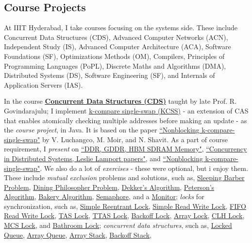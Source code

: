 \subsection{Course Projects}

At IIIT Hyderabad, I take courses focusing on the systems side. These include Concurrent Data Structures (CDS), Advanced Computer Networks (ACN), Independent Study (IS), Advanced Computer Architecture (ACA), Software Foundations (SF), Optimizations Methods (OM), Compilers, Principles of Programming Languages (PoPL), Discrete Maths and Algorithms (DMA), Distributed Systems (DS), Software Engineering (SF), and Internals of Application Servers (IAS).

In the course \textbf{\href{https://github.com/iiithf/concurrent-data-structures}{Concurrent Data Structures (CDS)}} taught by late Prof. R. Govindarajulu; I implement \href{https://github.com/javaf/k-compare-single-swap}{k-compare single-swap (KCSS)} - an extension of CAS that enables atomically checking multiple addresses before making an update - as the \textit{course project}, in Java. It is based on the paper \href{https://dl.acm.org/doi/10.1145/777412.777468}{``Nonblocking k-compare-single-swap"} by V. Luchangco, M. Moir, and N. Shavit. As a part of course requirement, I \textit{present} on \href{https://gist.github.com/wolfram77/28da72ab511eacafbd55f3576fb03019}{``DDR, GDDR, HBM SDRAM Memory"}, \href{https://gist.github.com/wolfram77/3507129650f2e56e00da013a7de93ddb}{``Concurrency in Distributed Systems, Leslie Lamport papers"}, and \href{https://gist.github.com/wolfram77/77758eb9f7d393598fc142d9559e5a5e}{``Nonblocking k-compare-single-swap"}. We also do a lot of \textit{exercises} - these were optional, but i enjoy them. These include \textit{mutual exclusion} problems and solutions, such as, \href{https://github.com/javaf/sleeping-barber-problem}{Sleeping Barber Problem}, \href{https://github.com/javaf/dining-philosophers-problem}{Dining Philosopher Problem}, \href{https://github.com/javaf/dekker-algorithm}{Dekker's Algorithm}, \href{https://github.com/javaf/peterson-algorithm}{Peterson's Algorithm}, \href{https://github.com/javaf/bakery-algorithm}{Bakery Algorithm}, \href{https://github.com/javaf/simple-semaphore}{Semaphore}, and a \href{https://github.com/javaf/monitor-example}{Monitor}; \textit{locks} for synchronization, such as, \href{https://github.com/javaf/simple-reentrant-lock}{Simple Reentrant Lock}, \href{https://github.com/javaf/simple-read-write-lock}{Simple Read Write Lock}, \href{https://github.com/javaf/fifo-read-write-lock}{FIFO Read Write Lock}, \href{https://github.com/javaf/tas-lock}{TAS Lock}, \href{https://github.com/javaf/ttas-lock}{TTAS Lock}, \href{https://github.com/javaf/backoff-lock}{Backoff Lock}, \href{https://github.com/javaf/array-lock}{Array Lock}, \href{https://github.com/javaf/clh-lock}{CLH Lock}, \href{https://github.com/javaf/mcs-lock}{MCS Lock}, and \href{https://github.com/javaf/bathroom-lock}{Bathroom Lock}; \textit{concurrent data structures}, such as, \href{https://github.com/javaf/locked-queue}{Locked Queue}, \href{https://github.com/javaf/array-queue}{Array Queue}, \href{https://github.com/javaf/array-stack}{Array Stack}, \href{https://github.com/javaf/backoff-stack}{Backoff Stack}, 